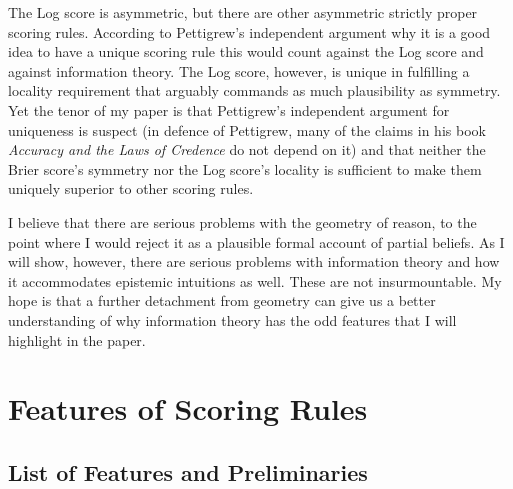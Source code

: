 \documentclass[12pt]{article}
\begin{document}
The Log score is asymmetric, but there are other asymmetric strictly
proper scoring rules. According to Pettigrew's independent argument
why it is a good idea to have a unique scoring rule this would count
against the Log score and against information theory. The Log score,
however, is unique in fulfilling a locality requirement that arguably
commands as much plausibility as symmetry. Yet the tenor of my paper
is that Pettigrew's independent argument for uniqueness is suspect (in
defence of Pettigrew, many of the claims in his book \emph{Accuracy
  and the Laws of Credence} do not depend on it) and that neither the
Brier score's symmetry nor the Log score's locality is sufficient to
make them uniquely superior to other scoring rules.

I believe that there are serious problems with the geometry of reason,
to the point where I would reject it as a plausible formal account of
partial beliefs. As I will show, however, there are serious problems
with information theory and how it accommodates epistemic intuitions
as well. These are not insurmountable. My hope is that a further
detachment from geometry can give us a better understanding of why
information theory has the odd features that I will highlight in the
paper.

\section{Features of Scoring Rules}
\label{sec:vidiedoo}

\subsection{List of Features and Preliminaries}
\label{subsec:ayudoosa}
\end{document}
